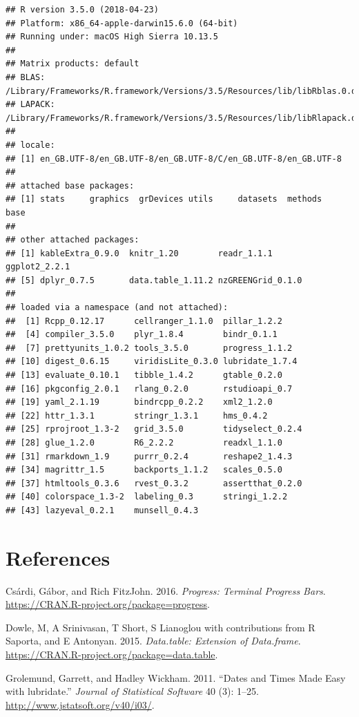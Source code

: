 \documentclass[]{article}
\begin{document}
\begin{verbatim}
## R version 3.5.0 (2018-04-23)
## Platform: x86_64-apple-darwin15.6.0 (64-bit)
## Running under: macOS High Sierra 10.13.5
## 
## Matrix products: default
## BLAS: /Library/Frameworks/R.framework/Versions/3.5/Resources/lib/libRblas.0.dylib
## LAPACK: /Library/Frameworks/R.framework/Versions/3.5/Resources/lib/libRlapack.dylib
## 
## locale:
## [1] en_GB.UTF-8/en_GB.UTF-8/en_GB.UTF-8/C/en_GB.UTF-8/en_GB.UTF-8
## 
## attached base packages:
## [1] stats     graphics  grDevices utils     datasets  methods   base     
## 
## other attached packages:
## [1] kableExtra_0.9.0  knitr_1.20        readr_1.1.1       ggplot2_2.2.1    
## [5] dplyr_0.7.5       data.table_1.11.2 nzGREENGrid_0.1.0
## 
## loaded via a namespace (and not attached):
##  [1] Rcpp_0.12.17      cellranger_1.1.0  pillar_1.2.2     
##  [4] compiler_3.5.0    plyr_1.8.4        bindr_0.1.1      
##  [7] prettyunits_1.0.2 tools_3.5.0       progress_1.1.2   
## [10] digest_0.6.15     viridisLite_0.3.0 lubridate_1.7.4  
## [13] evaluate_0.10.1   tibble_1.4.2      gtable_0.2.0     
## [16] pkgconfig_2.0.1   rlang_0.2.0       rstudioapi_0.7   
## [19] yaml_2.1.19       bindrcpp_0.2.2    xml2_1.2.0       
## [22] httr_1.3.1        stringr_1.3.1     hms_0.4.2        
## [25] rprojroot_1.3-2   grid_3.5.0        tidyselect_0.2.4 
## [28] glue_1.2.0        R6_2.2.2          readxl_1.1.0     
## [31] rmarkdown_1.9     purrr_0.2.4       reshape2_1.4.3   
## [34] magrittr_1.5      backports_1.1.2   scales_0.5.0     
## [37] htmltools_0.3.6   rvest_0.3.2       assertthat_0.2.0 
## [40] colorspace_1.3-2  labeling_0.3      stringi_1.2.2    
## [43] lazyeval_0.2.1    munsell_0.4.3
\end{verbatim}

\section*{References}\label{references}

\hypertarget{refs}{}
\hypertarget{ref-progress}{}
Csárdi, Gábor, and Rich FitzJohn. 2016. \emph{Progress: Terminal
Progress Bars}. \url{https://CRAN.R-project.org/package=progress}.

\hypertarget{ref-data.table}{}
Dowle, M, A Srinivasan, T Short, S Lianoglou with contributions from R
Saporta, and E Antonyan. 2015. \emph{Data.table: Extension of
Data.frame}. \url{https://CRAN.R-project.org/package=data.table}.

\hypertarget{ref-lubridate}{}
Grolemund, Garrett, and Hadley Wickham. 2011. ``Dates and Times Made
Easy with lubridate.'' \emph{Journal of Statistical Software} 40 (3):
1--25. \url{http://www.jstatsoft.org/v40/i03/}.
\end{document}
